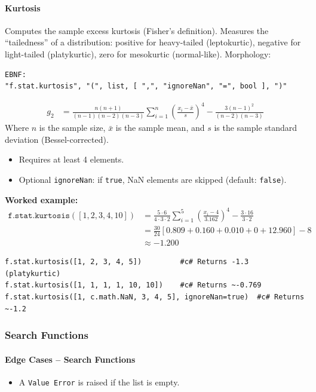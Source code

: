 \paragraph{Kurtosis}
Computes the sample excess kurtosis (Fisher's definition). Measures the ``tailedness'' of a distribution: positive for heavy-tailed (leptokurtic), negative for light-tailed (platykurtic), zero for mesokurtic (normal-like).
Morphology:
\begin{verbatim}
EBNF:
"f.stat.kurtosis", "(", list, [ ",", "ignoreNan", "=", bool ], ")"
\end{verbatim}
\begin{align*}
g_2 &= \frac{n(n+1)}{(n-1)(n-2)(n-3)} \sum_{i=1}^{n} \left( \frac{x_i - \bar{x}}{s} \right)^4 - \frac{3(n-1)^2}{(n-2)(n-3)}
\end{align*}
Where $n$ is the sample size, $\bar{x}$ is the sample mean, and $s$ is the sample standard deviation (Bessel-corrected).
\begin{itemize}
\item Requires at least 4 elements.
\item Optional \texttt{ignoreNan}: if \texttt{true}, NaN elements are skipped (default: \texttt{false}).
\end{itemize}

\textbf{Worked example:}
\begin{align*}
\texttt{f.stat.kurtosis}([1, 2, 3, 4, 10]) &= \frac{5 \cdot 6}{4 \cdot 3 \cdot 2} \sum_{i=1}^{5} \left( \frac{x_i - 4}{3.162} \right)^4 - \frac{3 \cdot 16}{3 \cdot 2} \\
&= \frac{30}{24} \left[ 0.809 + 0.160 + 0.010 + 0 + 12.960 \right] - 8 \\
&\approx -1.200
\end{align*}

\begin{verbatim}
f.stat.kurtosis([1, 2, 3, 4, 5])         #c# Returns -1.3 (platykurtic)
f.stat.kurtosis([1, 1, 1, 1, 10, 10])    #c# Returns ~-0.769
f.stat.kurtosis([1, c.math.NaN, 3, 4, 5], ignoreNan=true)  #c# Returns ~-1.2
\end{verbatim}

\subsubsection{Search Functions}

\paragraph{Edge Cases -- Search Functions}
\begin{itemize}
\item A \texttt{Value Error} is raised if the list is empty.
\end{itemize}

